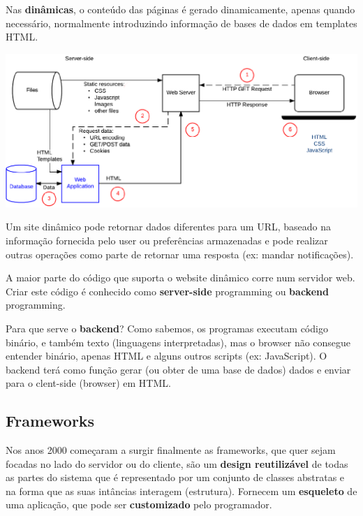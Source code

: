 \documentclass{article}
\begin{document}
Nas \textbf{dinâmicas}, o conteúdo das páginas é gerado dinamicamente,
apenas quando necessário, normalmente introduzindo informação de bases
de dados em templates HTML.

\begin{center}
  \includegraphics[scale=0.45]{73}
\end{center}

Um site dinâmico pode retornar dados diferentes para um URL,
baseado na informação fornecida pelo user ou preferências
armazenadas e pode realizar outras operações como parte de
retornar uma resposta (ex:  mandar notificações).

\vspace{2mm}

A maior parte do código que suporta o website dinâmico corre num servidor
web. Criar este código é conhecido como \textbf{server-side} programming
ou \textbf{backend} programming.

\vspace{2mm}

Para que serve o \textbf{backend}? Como sabemos, os programas executam
código binário, e também texto (linguagens interpretadas),
mas o browser não consegue entender binário, apenas HTML
e alguns outros scripts (ex: JavaScript). O backend
terá como função gerar (ou obter de uma base de dados) dados
e enviar para o clent-side (browser) em HTML.

\subsection{Frameworks}

Nos anos 2000 começaram a surgir finalmente as frameworks, que quer sejam focadas no lado
do servidor ou do cliente, são um \textbf{design reutilizável} de todas
as partes do sistema que é representado por um conjunto de classes
abstratas e na forma que as suas intâncias interagem (estrutura).
Fornecem um \textbf{esqueleto} de uma aplicação, que pode ser
\textbf{customizado} pelo programador.
\end{document}
